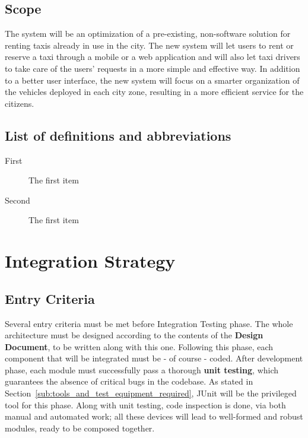 \documentclass[a4paper, 11pt]{article}
\begin{document}
\subsection{Scope} %
\label{sub:scope}
The system will be an optimization of a pre-existing, non-software solution for renting taxis already in use in the city. The new system will let users to rent or reserve a taxi through a mobile or a web application and will also let taxi drivers to take care of the users' requests in a more simple and effective way. In addition to a better user interface, the new system will focus on a smarter organization of the vehicles deployed in each city zone, resulting in a more efficient service for the citizens.


\subsection{List of definitions and abbreviations} 
\label{sub:list_of_definitions_and_abbreviations}

\begin{description}
    \item[First] The first item
    \item[Second] The first item 
\end{description}

\section{Integration Strategy} 
\label{sec:integration_strategy}

\subsection{Entry Criteria} 
\label{sub:entry_criteria}
Several entry criteria must be met before Integration Testing phase. 
The whole architecture must be designed according to the contents of the \textbf{Design Document}, to be written along with this one. 
Following this phase, each component that will be integrated must be - of course - coded.
After development phase, each module must successfully pass a thorough \textbf{unit testing}, which guarantees the absence of critical bugs in the codebase. As stated in Section~\ref{sub:tools_and_test_equipment_required}, JUnit will be the privileged tool for this phase.
Along with unit testing, code inspection is done, via both manual and automated work; all these devices will lead to well-formed and robust modules, ready to be composed together.
\end{document}
